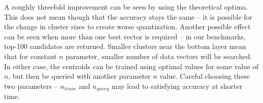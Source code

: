 A roughly threefold improvement can be seen by using the theoretical optima.
This does not mean though that the accuracy stays the same -- it is possible
for the change in cluster sizes to create worse quantization. Another
possible effect can be seen when more than one best vector is required --
in our benchmarks, top-100 candidates are returned. Smaller clusters near
the bottom layer mean that for constant $n$ parameter, smaller number of
data vectors will be searched.
In either case, the centroids can
be trained using optimal values for some value of $n$, but then be queried
with another parameter $n$ value. Careful choosing these two parameters --
$n_{train}$ and $n_{query}$ may lead to satisfying accuracy at shorter time.

